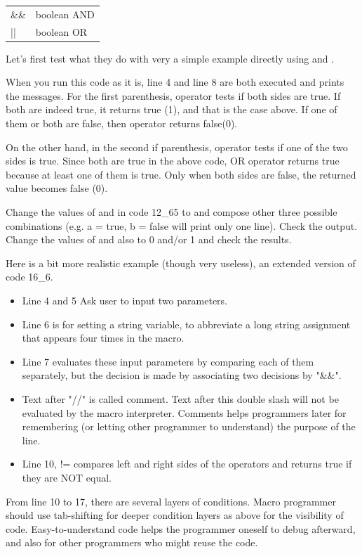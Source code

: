 \begin{indentCom}
 \begin{tabular*}{0.5\textwidth}{ l l }
\&\& & boolean AND\\
|| & boolean OR\\
\end{tabular*}
\end{indentCom}

Let's first test what they do with very a simple example directly using
 and .

When you run this code as it is, line 4 and line 8 are both executed and prints
the messages. For the first  parenthesis, \ilcom{\&\&} operator tests if
both sides are true. If both are indeed true, it returns true (1), and that is
the case above. If one of them or both are false, then \ilcom{\&\&}
operator returns false(0). 

On the other hand, in the second if parenthesis,
\ilcom{||} operator tests if one of the two sides is true. Since both are
true in the above code, OR operator returns true because at least one of them is
true. Only when both sides are false, the returned value becomes false (0).

\begin{indentexercise}{1}
Change the values of  and  in code 12\_65 to  and
compose other three possible combinations (e.g. a = true, b = false will print
only one line).
Check the output. Change the values of  and  also to 0 and/or
1 and check the results. 
\end{indentexercise}

Here is a bit more realistic example (though very useless), an extended version
of code 16\_6.

\begin{itemize}
\item Line 4 and 5 Ask user to input two parameters.
\item Line 6 is for setting a string variable, to abbreviate a long string assignment that appears four times in the macro.
\item Line 7 evaluates these input parameters by comparing each of them separately, but the decision is made by associating two decisions by "\&\&". 
\item Text after "//" is called comment. Text after this double slash will not be evaluated by the macro interpreter. Comments helps programmers later for remembering (or letting other programmer to understand) the purpose of the line. 
\item Line 10, != compares left and right sides of the operators and returns true if they are NOT equal.   
\end{itemize}
From line 10 to 17, there are several layers of conditions. Macro programmer should use tab-shifting for deeper condition layers as above for the visibility of code. Easy-to-understand code helps the programmer oneself to debug afterward, and also for other programmers who might reuse the code.
